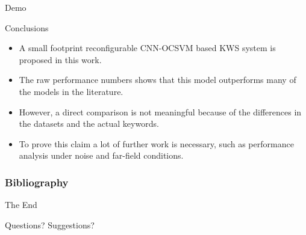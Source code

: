 \documentclass{beamer}
\begin{document}
\begin{frame}{Demo}
\end{frame}


\begin{frame}{Conclusions}
	\begin{itemize}
		\item<1-> A small footprint reconfigurable CNN-OCSVM based KWS system is proposed in this work. 
		\item<2-> The raw performance numbers shows that this model outperforms many of the models in the literature. \item<3-> However, a direct comparison is not meaningful because of the differences in the datasets and the actual keywords. 
		\item<4-> To prove this claim a lot of further work is necessary, such as performance analysis under noise and far-field conditions.
	\end{itemize}
\end{frame}


\begin{frame}
	\frametitle{Bibliography}
	\printbibliography[heading=none]
\end{frame}



\begin{frame}
	\huge{\centerline{The End}}
	
	\hspace{10em}
	
	\huge{\centerline{Questions? Suggestions?}}
\end{frame}
\end{document}
